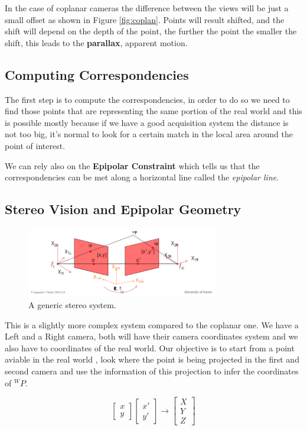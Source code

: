 In the case of coplanar cameras the difference between the views will be just a small offset as shown in Figure \ref{fig:coplan}. Points will result shifted, and the shift will depend on the depth of the point, the further the point the smaller the shift, this leads to the \textbf{parallax}, apparent motion.  

\subsection{Computing Correspondencies}

The first step is to compute the correspondencies, in order to do so we need to find those points that are representing the same portion of the real world and this is possible mostly because if we have a good acquisition system the distance is not too big, it's normal to look for a certain match in the local area around the point of interest.

We can rely also on the \textbf{Epipolar Constraint} which tells us that the correspondencies can be met along a horizontal line called the \textit{epipolar line}.

\subsection{Stereo Vision and Epipolar Geometry}

\begin{figure}[H]
    \centering
    \includegraphics[width=0.75\textwidth]{Figures/stereo.png}
    \caption{A generic stereo system.}
    \label{fig:stereo}
\end{figure}

This is a slightly more complex system compared to the coplanar one. We have a Left and a Right camera, both will have their camera coordinates system and we also have to coordinates of the real world. Our objective is to start from a point aviable in the real world , look where the point is being projected in the first and second camera and use the information of this projection to infer the coordinates of \({}^WP\).

\[
    \begin{bmatrix}
        x \\
        y
    \end{bmatrix}
    \begin{bmatrix}
        x' \\
        y'
    \end{bmatrix}
    \rightarrow 
    \begin{bmatrix}
        X \\
        Y \\
        Z
    \end{bmatrix}
\]

